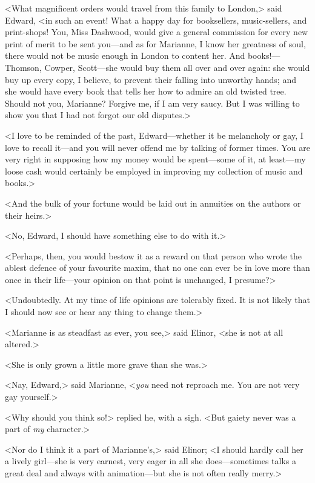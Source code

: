 <What magnificent orders would travel from this family to London,> said Edward, <in such an event! What a happy day for booksellers, music-sellers, and print-shops! You, Miss Dashwood, would give a general commission for every new print of merit to be sent you—and as for Marianne, I know her greatness of soul, there would not be music enough in London to content her. And books!—Thomson, Cowper, Scott—she would buy them all over and over again: she would buy up every copy, I believe, to prevent their falling into unworthy hands; and she would have every book that tells her how to admire an old twisted tree. Should not you, Marianne? Forgive me, if I am very saucy. But I was willing to show you that I had not forgot our old disputes.>

<I love to be reminded of the past, Edward—whether it be melancholy or gay, I love to recall it—and you will never offend me by talking of former times. You are very right in supposing how my money would be spent—some of it, at least—my loose cash would certainly be employed in improving my collection of music and books.>

<And the bulk of your fortune would be laid out in annuities on the authors or their heirs.>

<No, Edward, I should have something else to do with it.>

<Perhaps, then, you would bestow it as a reward on that person who wrote the ablest defence of your favourite maxim, that no one can ever be in love more than once in their life—your opinion on that point is unchanged, I presume?>

<Undoubtedly. At my time of life opinions are tolerably fixed. It is not likely that I should now see or hear any thing to change them.>

<Marianne is as steadfast as ever, you see,> said Elinor, <she is not at all altered.>

<She is only grown a little more grave than she was.>

<Nay, Edward,> said Marianne, <\textit{you} need not reproach me. You are not very gay yourself.>

<Why should you think so!> replied he, with a sigh. <But gaiety never was a part of \textit{my} character.>

<Nor do I think it a part of Marianne's,> said Elinor; <I should hardly call her a lively girl—she is very earnest, very eager in all she does—sometimes talks a great deal and always with animation—but she is not often really merry.>

